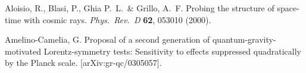 \documentclass[12pt]{article}
\begin{document}
\begin{thebibliography}{99}
Aloisio, R., Blasi, P., Ghia P.~L.~\& Grillo, A.~F.
Probing the structure of space-time with cosmic rays.
{\em Phys.\ Rev.\ D} {\bf 62}, 053010 (2000).

Amelino-Camelia, G. Proposal of a second generation of
quantum-gravity-motivated  Lorentz-symmetry tests: Sensitivity to
effects suppressed quadratically  by the Planck scale.
[arXiv:gr-qc/0305057].

\end{thebibliography}
\end{document}
